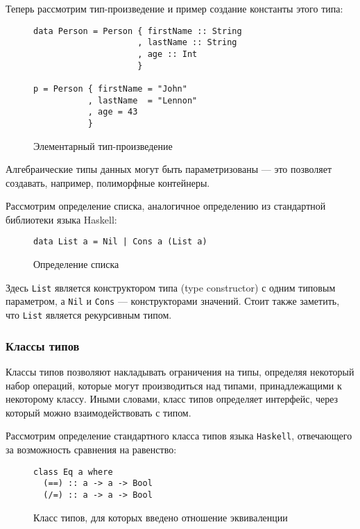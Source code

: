 Теперь рассмотрим тип-произведение и пример создание константы этого типа: 

\begin{figure}[h]
\begin{lstlisting}
data Person = Person { firstName :: String
                     , lastName :: String
                     , age :: Int
                     }

p = Person { firstName = "John"
           , lastName  = "Lennon"
           , age = 43
           }
\end{lstlisting}
\caption{Элементарный тип-произведение}
\label{listing:Bool}
\end{figure}

Алгебраические типы данных могут быть параметризованы --- это позволяет создавать, например, полиморфные контейнеры.

Рассмотрим определение списка, аналогичное определению из стандартной библиотеки языка Haskell:

\begin{figure}[h]
\begin{lstlisting}
data List a = Nil | Cons a (List a)
\end{lstlisting}
\caption{Определение списка}
\label{listing:List}
\end{figure}

Здесь \lstinline{List} является конструктором типа (type constructor) с одним типовым параметром, а \lstinline{Nil} и \lstinline{Cons} --- конструкторами значений. Стоит также заметить, что \lstinline{List} является рекурсивным типом.

\subsubsection{Классы типов}

Классы типов позволяют накладывать ограничения на типы, определяя некоторый набор операций, которые могут производиться над типами, принадлежащими к некоторому классу. Иными словами, класс типов определяет интерфейс, через который можно взаимодействовать с типом.

Рассмотрим определение стандартного класса типов языка \lstinline{Haskell}, отвечающего за возможность сравнения на равенство:

\begin{figure}[h]
\begin{lstlisting}
class Eq a where
  (==) :: a -> a -> Bool
  (/=) :: a -> a -> Bool
\end{lstlisting}
\caption{Класс типов, для которых введено отношение эквиваленции}
\label{listing:Eq}
\end{figure}

